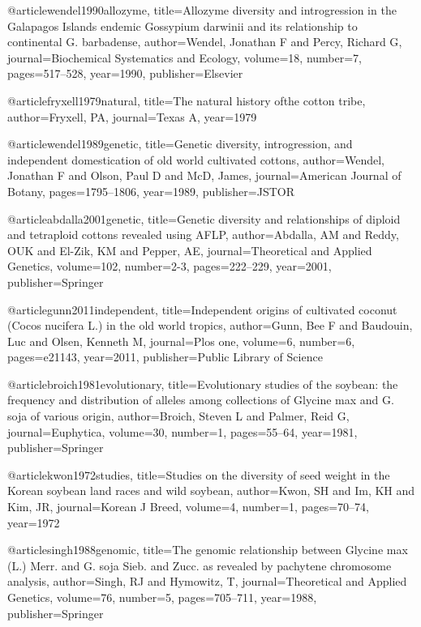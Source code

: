 @article{wendel1990allozyme,
  title={Allozyme diversity and introgression in the Galapagos Islands endemic Gossypium darwinii and its relationship to continental G. barbadense},
  author={Wendel, Jonathan F and Percy, Richard G},
  journal={Biochemical Systematics and Ecology},
  volume={18},
  number={7},
  pages={517--528},
  year={1990},
  publisher={Elsevier}
}

@article{fryxell1979natural,
  title={The natural history ofthe cotton tribe},
  author={Fryxell, PA},
  journal={Texas A},
  year={1979}
}

@article{wendel1989genetic,
  title={Genetic diversity, introgression, and independent domestication of old world cultivated cottons},
  author={Wendel, Jonathan F and Olson, Paul D and McD, James},
  journal={American Journal of Botany},
  pages={1795--1806},
  year={1989},
  publisher={JSTOR}
}

@article{abdalla2001genetic,
  title={Genetic diversity and relationships of diploid and tetraploid cottons revealed using AFLP},
  author={Abdalla, AM and Reddy, OUK and El-Zik, KM and Pepper, AE},
  journal={Theoretical and Applied Genetics},
  volume={102},
  number={2-3},
  pages={222--229},
  year={2001},
  publisher={Springer}
}

@article{gunn2011independent,
  title={Independent origins of cultivated coconut (Cocos nucifera L.) in the old world tropics},
  author={Gunn, Bee F and Baudouin, Luc and Olsen, Kenneth M},
  journal={Plos one},
  volume={6},
  number={6},
  pages={e21143},
  year={2011},
  publisher={Public Library of Science}
}

@article{broich1981evolutionary,
  title={Evolutionary studies of the soybean: the frequency and distribution of alleles among collections of Glycine max and G. soja of various origin},
  author={Broich, Steven L and Palmer, Reid G},
  journal={Euphytica},
  volume={30},
  number={1},
  pages={55--64},
  year={1981},
  publisher={Springer}
}

@article{kwon1972studies,
  title={Studies on the diversity of seed weight in the Korean soybean land races and wild soybean},
  author={Kwon, SH and Im, KH and Kim, JR},
  journal={Korean J Breed},
  volume={4},
  number={1},
  pages={70--74},
  year={1972}
}

@article{singh1988genomic,
  title={The genomic relationship between Glycine max (L.) Merr. and G. soja Sieb. and Zucc. as revealed by pachytene chromosome analysis},
  author={Singh, RJ and Hymowitz, T},
  journal={Theoretical and Applied Genetics},
  volume={76},
  number={5},
  pages={705--711},
  year={1988},
  publisher={Springer}
}

